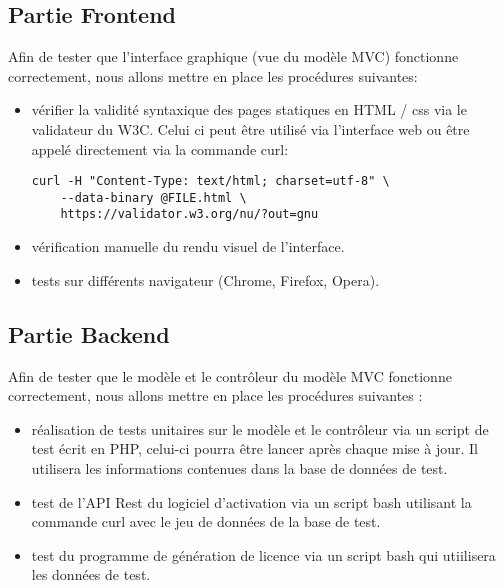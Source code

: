 \subsection{Partie Frontend}

Afin de tester que l'interface graphique (vue du modèle MVC) fonctionne correctement, nous allons mettre en place les procédures suivantes:
\begin{itemize}

    \item vérifier la validité syntaxique des pages statiques en HTML / css via 
          le validateur du W3C. Celui ci peut être utilisé via l'interface web ou  
          être appelé directement via la commande curl:
          \begin{verbatim}
curl -H "Content-Type: text/html; charset=utf-8" \
    --data-binary @FILE.html \
    https://validator.w3.org/nu/?out=gnu
          \end{verbatim}
              
    \item vérification manuelle du rendu visuel de l'interface.
    \item tests sur différents navigateur (Chrome, Firefox, Opera).
            
\end{itemize}
\newpage

\subsection{Partie Backend}

Afin de tester que le modèle et le contrôleur du modèle MVC fonctionne correctement, 
nous allons mettre en place les procédures suivantes :
\begin{itemize}
    \item réalisation de tests unitaires sur le modèle et le contrôleur via 
          un script de test écrit en PHP, celui-ci pourra être lancer après 
          chaque mise à jour. Il utilisera les informations contenues dans la  
          base de données de test.
        
    \item test de l'API Rest du logiciel d'activation via un script bash 
          utilisant la commande curl avec le jeu de données de la base de test.
        
    \item test du programme de génération de licence via un script bash qui
          utiilisera les données de test.
\end{itemize}

